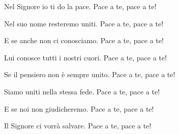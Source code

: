 
\strofa Nel Signore io ti do la pace. Pace a te, pace a te! 

\spazio

Nel suo nome resteremo uniti. Pace a te, pace a te! 

\spazio

\strofa E se anche non ci conosciamo. Pace a te, pace a te! 

\spazio

Lui conosce tutti i nostri cuori. Pace a te, pace a te! 

\spazio

\strofa Se il pensiero non è sempre unito. Pace a te, pace a te! 

\spazio

Siamo uniti nella stessa fede. Pace a te, pace a te! 

\spazio

\strofa E se noi non giudicheremo. Pace a te, pace a te!

\spazio

Il Signore ci vorrà salvare. Pace a te, pace a te! 